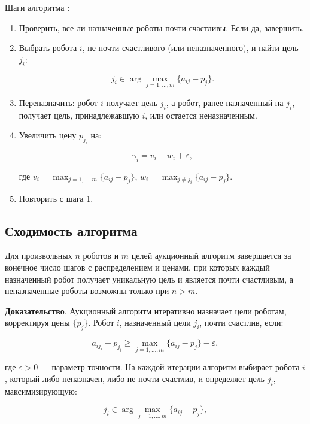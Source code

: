 Шаги алгоритма \cite{bertsekas1990}:

\begin{enumerate}
    \item Проверить, все ли назначенные роботы почти счастливы. Если да, завершить.
    \item Выбрать робота \( i \), не почти счастливого (или неназначенного), и найти цель \( j_i \):

    \[
    j_i \in \arg \max_{j=1,\ldots,m} \{a_{ij} - p_j\}.
    \]

    \item Переназначить: робот \( i \) получает цель \( j_i \), а робот, ранее назначенный на \( j_i \), получает цель, принадлежавшую \( i \), или остается неназначенным.
    \item Увеличить цену \( p_{j_i} \) на:

    \[
    \gamma_i = v_i - w_i + \varepsilon,
    \]

    где \( v_i = \max_{j=1,\ldots,m} \{a_{ij} - p_j\} \), \( w_i = \max_{j \neq j_i} \{a_{ij} - p_j\} \).
    \item Повторить с шага 1.
\end{enumerate}

\subsection{Сходимость алгоритма}
\begin{theorem}
\label{thm:auction_convergence}
Для произвольных \( n \) роботов и \( m \) целей аукционный алгоритм завершается за конечное число шагов с распределением и ценами, при которых каждый назначенный робот получает уникальную цель и является почти счастливым, а неназначенные роботы возможны только при \( n > m \).
\end{theorem}

\textbf{Доказательство}. Аукционный алгоритм итеративно назначает цели роботам, корректируя цены \( \{p_j\} \). Робот \( i \), назначенный цели \( j_i \), почти счастлив, если:

\[
a_{i j_i} - p_{j_i} \geq \max_{j=1,\ldots,m} \{a_{ij} - p_j\} - \varepsilon,
\]

где \( \varepsilon > 0 \) — параметр точности. На каждой итерации алгоритм выбирает робота \( i \), который либо неназначен, либо не почти счастлив, и определяет цель \( j_i \), максимизирующую:

\[
j_i \in \arg \max_{j=1,\ldots,m} \{a_{ij} - p_j\},
\]

